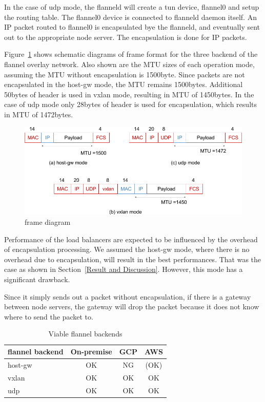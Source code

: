 In the case of udp mode, the flanneld will create a tun device, flannel0 and setup the routing table.
The flannel0 device is connected to flanneld daemon itself.
An IP packet routed to flannel0 is encapsulated bye the flanneld, and eventually sent out 
to the appropriate node server. 
The encapsulation is done for IP packets.

Figure~\ref{fig:flannel-packet-diagram} shows schematic diagrams of frame format for the three backend of 
the flannel overlay network.
Also shown are the MTU sizes of each operation mode, assuming the MTU without encapsulation is 1500byte.
Since packets are not encapsulated in the host-gw mode, the MTU remains 1500bytes.
Additional 50bytes of header is used in vxlan mode, resulting in MTU of 1450bytes.
In the case of udp mode only 28bytes of header is used for encapsulation, which results in MTU of 1472bytes.


\begin{figure}
\includegraphics[width=\columnwidth]{Figs/flannel-packet-diagram}
\caption{frame diagram}
\label{fig:flannel-packet-diagram}
\end{figure}

Performance of the load balancers are expected to be influenced by the overhead of encapsulation processing.
We assumed the host-gw mode, where there is no overhead due to encapsulation, will result in the best performances.
That was the case as shown in Section~\ref{Result and Discussion}.
However, this mode has a significant drawback.

Since it simply sends out a packet without encapsulation, 
if there is a gateway between node servers, 
the gateway will drop the packet because it does not know where to send the packet to.

\begin{table}
  \begin{tabular}{lccc}
    \toprule
    flannel backend & On-premise & GCP & AWS \\
    \midrule
    host-gw & OK & NG & (OK) \\
    vxlan & OK & OK & OK \\
    udp & OK & OK & OK \\
    \bottomrule
\end{tabular}
  \caption{Viable flannel backends}
  \label{tab:Viable flannel backends}
\end{table}

